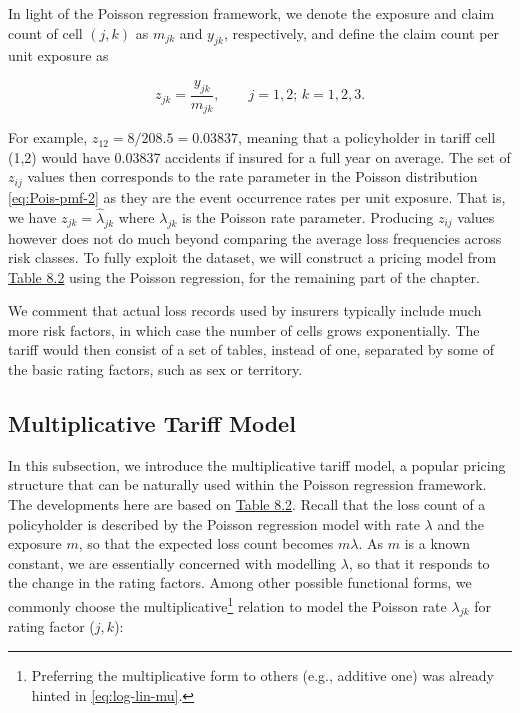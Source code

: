 \documentclass[]{book}
\let\rmarkdownfootnote\footnote%
\def\footnote{\protect\rmarkdownfootnote}
\theoremstyle{definition}
\theoremstyle{definition}
\theoremstyle{definition}
\theoremstyle{remark}
\begin{document}
In light of the Poisson regression framework, we denote the exposure and
claim count of cell \((j,k)\) as \(m_{jk}\) and \(y_{jk}\),
respectively, and define the claim count per unit exposure as

\begin{equation}
\nonumber
z_{jk}= \frac{y_{jk}}{ m_{jk}}, \qquad j=1,2;\, k=1, 2,3.
\end{equation}

For example, \(z_{12}=8/208.5=0.03837\), meaning that a policyholder in
tariff cell (1,2) would have 0.03837 accidents if insured for a full
year on average. The set of \(z_{ij}\) values then corresponds to the
rate parameter in the Poisson distribution \eqref{eq:Pois-pmf-2} as they
are the event occurrence rates per unit exposure. That is, we have
\(z_{jk}=\hat{\lambda}_{jk}\) where \({\lambda}_{jk}\) is the Poisson
rate parameter. Producing \(z_{ij}\) values however does not do much
beyond comparing the average loss frequencies across risk classes. To
fully exploit the dataset, we will construct a pricing model from
\protect\hyperlink{tab:8.2}{Table 8.2} using the Poisson regression, for
the remaining part of the chapter.

We comment that actual loss records used by insurers typically include
much more risk factors, in which case the number of cells grows
exponentially. The tariff would then consist of a set of tables, instead
of one, separated by some of the basic rating factors, such as sex or
territory.

\subsection{Multiplicative Tariff
Model}\label{multiplicative-tariff-model}

In this subsection, we introduce the multiplicative tariff model, a
popular pricing structure that can be naturally used within the Poisson
regression framework. The developments here are based on
\protect\hyperlink{tab:8.2}{Table 8.2}. Recall that the loss count of a
policyholder is described by the Poisson regression model with rate
\(\lambda\) and the exposure \(m\), so that the expected loss count
becomes \(m\lambda\). As \(m\) is a known constant, we are essentially
concerned with modelling \(\lambda\), so that it responds to the change
in the rating factors. Among other possible functional forms, we
commonly choose the multiplicative\footnote{Preferring the
  multiplicative form to others (e.g., additive one) was already hinted
  in \eqref{eq:log-lin-mu}.} relation to model the Poisson rate
\(\lambda_{jk}\) for rating factor (\(j,k\)):
\end{document}
